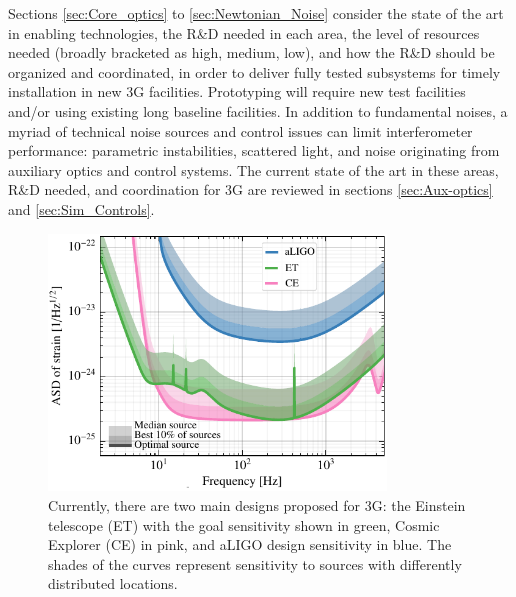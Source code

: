 Sections \ref{sec:Core_optics} to \ref{sec:Newtonian_Noise} consider the state of the art in enabling technologies, the R\&D needed in each area, the level of resources needed (broadly bracketed as high, medium, low),
and how the R\&D should be organized and coordinated, in order to deliver fully tested subsystems for timely installation in new 3G facilities. Prototyping will require new test facilities and/or using existing long baseline facilities.
In addition to fundamental noises, a myriad of technical noise sources and control issues can limit interferometer performance: parametric instabilities, scattered light, and noise originating from auxiliary optics and control systems.  The current state of the art in these areas, R\&D needed, and coordination for 3G are reviewed in sections \ref{sec:Aux-optics} and \ref{sec:Sim_Controls}. 

\begin{figure}[ht]
\centering
\includegraphics*[width= 0.8\textwidth]{Figures/noises_percentiles-Voyager.pdf}
\caption{Currently, there are two main designs proposed for 3G: the Einstein telescope (ET) \cite{ET2011} with the goal sensitivity shown in green, Cosmic Explorer (CE) \cite{CosmicExplorer2017} in pink, and aLIGO design sensitivity in blue. 
The shades of the curves represent sensitivity to sources with differently distributed locations.}
\label{fig:3GSens}
\end{figure}

